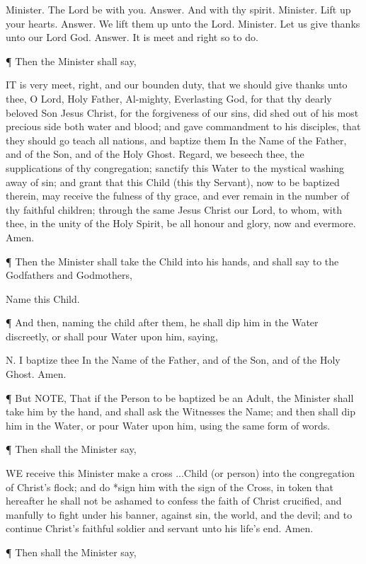  
 	Minister.	The Lord be with you.
 	Answer.	And with thy spirit.
 	Minister.	Lift up your hearts.
 	Answer.	
We lift them up unto the Lord.
 	Minister.	
Let us give thanks unto our Lord God.
 	Answer.	
It is meet and right so to do.
 
¶ Then the Minister shall say,

IT is very meet, right, and our bounden duty, that we should give thanks unto thee, O Lord, Holy Father, Al-mighty, Everlasting God, for that thy dearly beloved Son Jesus Christ, for the forgiveness of our sins, did shed out of his most precious side both water and blood; and gave commandment to his disciples, that they should go teach all nations, and baptize them In the Name of the Father, and of the Son, and of the Holy Ghost. Regard, we beseech thee, the supplications of thy congregation; sanctify this Water to the mystical washing away of sin; and grant that this Child (this thy Servant), now to be baptized therein, may receive the fulness of thy grace, and ever remain in the number of thy faithful children; through the same Jesus Christ our Lord, to whom, with thee, in the unity of the Holy Spirit, be all honour and glory, now and evermore. Amen.

¶ Then the Minister shall take the Child into his hands, and shall say to the Godfathers and Godmothers,

Name this Child.

¶ And then, naming the child after them, he shall dip him in the Water discreetly, or shall pour Water upon him, saying,

N. I baptize thee In the Name of the Father, and of the Son, and of the Holy Ghost. Amen.

¶ But NOTE, That if the Person to be baptized be an Adult, the Minister shall take him by the hand, and shall ask the Witnesses the Name; and then shall dip him in the Water, or pour Water upon him, using the same form of words.
 

 
¶ Then shall the Minister say,

WE receive this Minister make a cross ...Child (or person) into the congregation of Christ’s flock; and do *sign him with the sign of the Cross, in token that hereafter he shall not be ashamed to confess the faith of Christ crucified, and manfully to fight under his banner, against sin, the world, and the devil; and to continue Christ’s faithful soldier and servant unto his life’s end. Amen.

¶ Then shall the Minister say,

